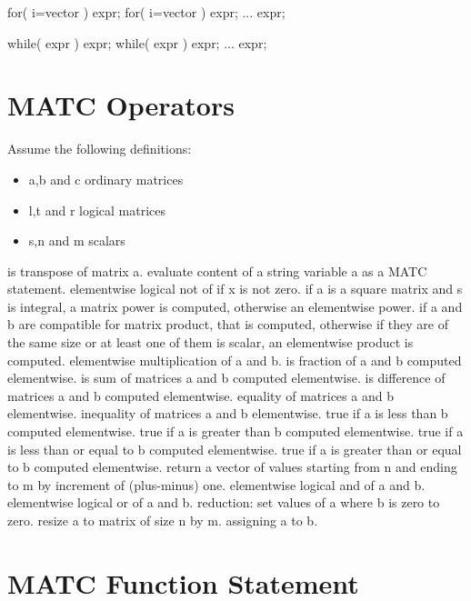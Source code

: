for( i=vector ) expr;
for( i=vector )
{
    expr;
    ...
    expr;
}

while( expr ) expr;
while( expr )
{
    expr;
    ...
    expr;
}
\ttend



\section{MATC Operators}

Assume the following definitions:
\begin{itemize}
\item a,b and c ordinary matrices  
\item l,t and r logical matrices 
\item s,n and m scalars 
\end{itemize}

\sifbegin
{} is transpose of matrix a. 
 evaluate content of a string variable a as a MATC statement. 
 elementwise logical not of  if x is not zero. 
 if a is a square matrix and s is integral, a matrix power is computed, otherwise an elementwise power. 
 if a and b are compatible for matrix product, that is computed, 
otherwise if they are of the same size or at least one of them is scalar, an elementwise product is computed. 
elementwise multiplication of a and b.  
 is fraction of a and b computed elementwise. 
 is sum of matrices a and b computed elementwise. 
 is difference of matrices a and b computed elementwise. 
 equality of matrices a and b elementwise.  
 inequality of matrices a and b elementwise.  
 true if a is less than b computed elementwise. 
 true if a is greater than b computed elementwise.
 true if a is less than or equal to b computed elementwise. 
 true if a is greater than or equal to b computed elementwise. 
 return a vector of values starting from n and ending to m by increment of (plus-minus) one.  
 elementwise logical and of a and b. 
 elementwise logical or of a and b. 
 reduction: set values of a where b is zero to zero. 
 resize a to matrix of size n by m. 
 assigning a to b. 
\sifend


\section{MATC Function Statement}



